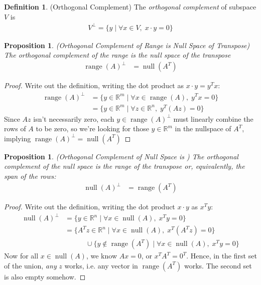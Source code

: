\documentclass[12pt]{article}
\numberwithin{equation}{section} %
\theoremstyle{plain}
\newtheorem{prop}[thm]{Proposition}
\theoremstyle{definition}
\newtheorem{defn}[thm]{Definition}
\theoremstyle{remark}
\newcommand{\R}{\mathbb{R}}
\newcommand{\Rn}{\mathbb{R}^n}
\newcommand{\Rm}{\mathbb{R}^m}
\newcommand{\nul}{\operatorname{null}}
\newcommand{\range}{\operatorname{range}}
\begin{document}
\begin{defn}(Orthogonal Complement)
The \emph{orthogonal complement} of subspace $V$ is
\begin{align*}
  V^\perp = \{ y\; | \; \forall x\in V,\; x\cdot y=0\}
\end{align*}
\end{defn}

\begin{prop}
\emph{(Orthogonal Complement of Range is Null Space of Transpose)}
The \emph{orthogonal complement of the range} is the null space of the
transpose
\begin{align*}
  \range(A)^{\perp}
  &= \nul(A^T)
\end{align*}
\end{prop}
\begin{proof}
Write out the definition, writing the dot product as $x\cdot y=y^Tx$:
\begin{align*}
  \range(A)^{\perp}
  &= \{y \in\Rm\;|\; \forall x\in \range(A), \; y^T x = 0\}
  \\
  &= \{y \in\Rm\;|\; \forall z\in\Rn, \; y^T (Az) = 0\}
\end{align*}
Since $Az$ isn't necessarily zero, each $y\in\range(A)^\perp$ must
linearly combine the rows of $A$ to be zero, so we're looking for those
$y\in\R^m$ in the nullspace of $A^T$, implying
$\range(A)^{\perp} = \nul(A^T)$
\end{proof}

\begin{prop}
\emph{(Orthogonal Complement of Null Space is )}
The \emph{orthogonal complement of the null space} is the range of the
transpose or, equivalently, the span of the rows:
\begin{align*}
  \nul(A)^{\perp}
  &= \range(A^T)
\end{align*}
\end{prop}
\begin{proof}
Write out the definition, writing the dot product $x\cdot y$ as $x^Ty$:
\begin{align*}
  \nul(A)^{\perp}
  &= \{y \in\Rn\;|\; \forall x\in \nul(A), \; x^Ty = 0\}
  \\
  &= \{A^Tz \in\Rn\;|\; \forall x\in \nul(A), \; x^T (A^Tz) = 0\}
  \\
  &\qquad\quad
  \cup \{y\not\in \range(A^T)\;|\;\forall x\in \nul(A), \; x^Ty = 0\}
\end{align*}
Now for all $x\in\nul(A)$, we know $Ax=0$, or $x^TA^T=0^T$. Hence, in
the first set of the union, \emph{any} $z$ works, i.e. any vector in
$\range(A^T)$ works.
The second set is also empty somehow.
\end{proof}
\end{document}
